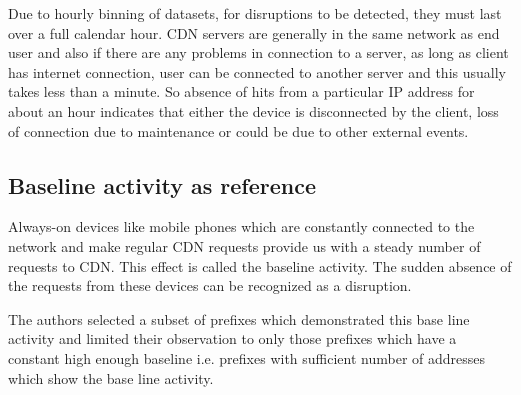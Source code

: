 \documentclass[11pt,twoside,a4paper]{article}
\begin{document}
Due to hourly binning of datasets, for disruptions to be detected, they must last over a full calendar hour. CDN servers are generally in the same network as end user and also if there are any problems in connection to a server, as long as client has internet connection, user can be connected to another server and this usually takes less than a minute. So absence of hits from a particular IP address for about an hour indicates that either the device is disconnected by the client, loss of connection due to maintenance or could be due to other external events. 

\subsection{Baseline activity as reference}
Always-on devices like mobile phones which are constantly connected to the network and make regular CDN requests provide us with a steady number of requests to CDN. This effect is called the baseline activity. The sudden absence of the requests from these devices can be recognized as a disruption. 

The authors selected a subset of prefixes which demonstrated this base line activity and limited their observation to only those prefixes which have a constant high enough baseline i.e. prefixes with sufficient number of addresses which show the base line activity. 
\end{document}
